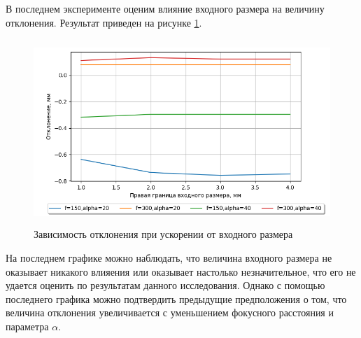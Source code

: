 {    В последнем эксперименте оценим влияние входного размера на величину отклонения. Результат приведен на рисунке \ref{acc_input}.

     \begin{figure}[H]
        \centering
        \includegraphics[height = 7cm]{plots/!graphics_acc_input.png}
        \caption{Зависимость отклонения при ускорении от входного размера}
        \label{acc_input}
    \end{figure}
      \vspace{0.5cm}
    На последнем графике можно наблюдать, что величина входного размера не оказывает никакого влияения или оказывает настолько незначительное,
    что его не удается оценить по результатам данного исследования. Однако с помощью последнего графика можно подтвердить предыдущие предположения о том, что величина отклонения
    увеличивается с уменьшением фокусного расстояния и параметра $\alpha$.

}
